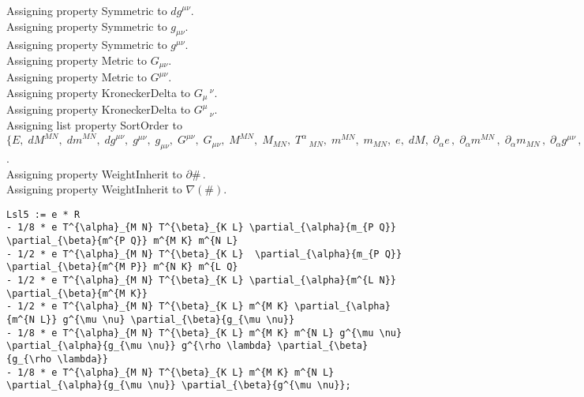 \documentclass[11pt]{article}
\begin{document}
Assigning property Symmetric to ${dg}^{\mu \nu}$.
\\
Assigning property Symmetric to ${g}_{\mu \nu}$.
\\
Assigning property Symmetric to ${g}^{\mu \nu}$.
\\
Assigning property Metric to ${G}_{\mu \nu}$.
\\
Assigning property Metric to ${G}^{\mu \nu}$.
\\
Assigning property KroneckerDelta to ${G}_{\mu}\,^{\nu}$.
\\
Assigning property KroneckerDelta to ${G}^{\mu}\,_{\nu}$.
\\
Assigning list property SortOrder to $\{E,\; {dM}^{M N},\; {dm}^{M N},\; {dg}^{\mu \nu},\; {g}^{\mu \nu},\; {g}_{\mu \nu},\; {G}^{\mu \nu},\; {G}_{\mu \nu},\; {M}^{M N},\; {M}_{M N},\; {T}^{\alpha}\,_{M N},\; {m}^{M N},\; {m}_{M N},\; e,\; dM,\; {\partial}_{\alpha}{e}\, ,\; {\partial}_{\alpha}{{m}^{M N}}\, ,\; {\partial}_{\alpha}{{m}_{M N}}\, ,\; {\partial}_{\alpha}{{g}^{\mu \nu}}\, ,\; {\partial}_{\alpha}{{g}_{\mu \nu}}\, ,\; {\partial}_{\alpha}{dM}\, ,\; {\partial}_{\alpha}{{M}^{M N}}\, ,\; {\partial}_{\alpha}{{M}_{M N}}\, ,\; {\partial}_{\alpha \beta}{{M}_{M N}}\, ,\; {\partial}_{\alpha \beta}{{M}^{M N}}\, \}$.
\\
Assigning property WeightInherit to $\partial{\#}\, $.
\\
Assigning property WeightInherit to $\nabla(\#)$.
\\
{\color[named]{Blue}\begin{verbatim}
Lsl5 := e * R
- 1/8 * e T^{\alpha}_{M N} T^{\beta}_{K L} \partial_{\alpha}{m_{P Q}} \partial_{\beta}{m^{P Q}} m^{M K} m^{N L} 
- 1/2 * e T^{\alpha}_{M N} T^{\beta}_{K L}  \partial_{\alpha}{m_{P Q}} \partial_{\beta}{m^{M P}} m^{N K} m^{L Q} 
- 1/2 * e T^{\alpha}_{M N} T^{\beta}_{K L} \partial_{\alpha}{m^{L N}} \partial_{\beta}{m^{M K}}
- 1/2 * e T^{\alpha}_{M N} T^{\beta}_{K L} m^{M K} \partial_{\alpha}{m^{N L}} g^{\mu \nu} \partial_{\beta}{g_{\mu \nu}}
- 1/8 * e T^{\alpha}_{M N} T^{\beta}_{K L} m^{M K} m^{N L} g^{\mu \nu} \partial_{\alpha}{g_{\mu \nu}} g^{\rho \lambda} \partial_{\beta}{g_{\rho \lambda}}
- 1/8 * e T^{\alpha}_{M N} T^{\beta}_{K L} m^{M K} m^{N L} \partial_{\alpha}{g_{\mu \nu}} \partial_{\beta}{g^{\mu \nu}};
\end{verbatim}}
\end{document}

